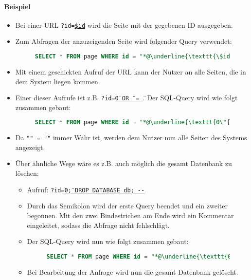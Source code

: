 		\paragraph{Beispiel}
			\begin{itemize}
				\item Bei einer URL \texttt{?id=\underline{\$id}} wird die Seite mit der gegebenen ID ausgegeben.
				\item Zum Abfragen der anzuzeigenden Seite wird folgender Query verwendet:
					\begin{figure}[H]
						\centering
						\begin{lstlisting}[language = SQL]
SELECT * FROM page WHERE id = "*@\underline{\texttt{\$id}}@*";
\end{lstlisting}
					\end{figure}
				\item Mit einem geschickten Aufruf der URL kann der Nutzer an alle Seiten, die in dem System liegen kommen.
				\item Einer dieser Aufrufe ist z.B. \texttt{?id=}\underline{\texttt{0\"{} OR {}\"{}\"{} = \"}}. Der SQL-Query wird wie folgt zusammen gebaut:
					\begin{figure}[H]
						\begin{lstlisting}[language = SQL]
SELECT * FROM page WHERE id = "*@\underline{\texttt{0\"{} OR {}\"{}\"{} = \"}}@*";
\end{lstlisting}
					\end{figure}
				\item Da \texttt{"" = ""} immer Wahr ist, werden dem Nutzer nun alle Seiten des Systems angezeigt.
				\item Über ähnliche Wege wäre es z.B. auch möglich die gesamt Datenbank zu löschen:
					\begin{itemize}
						\item Aufruf: \texttt{?id=\underline{0\"; DROP DATABASE db; -{}-}}
						\item Durch das Semikolon wird der erste Query beendet und ein zweiter begonnen. Mit den zwei Bindestrichen am Ende wird ein Kommentar eingeleitet, sodass die Abfrage nicht fehlschlägt.
						\item Der SQL-Query wird nun wie folgt zusammen gebaut:
							\begin{figure}[H]
								\begin{lstlisting}[language = SQL]
SELECT * FROM page WHERE id = "*@\underline{\texttt{0\"; DROP DATABASE db; -{}-}}@*";
\end{lstlisting}
							\end{figure}
						\item Bei Bearbeitung der Anfrage wird nun die gesamt Datenbank gelöscht.
					\end{itemize}
			\end{itemize}

